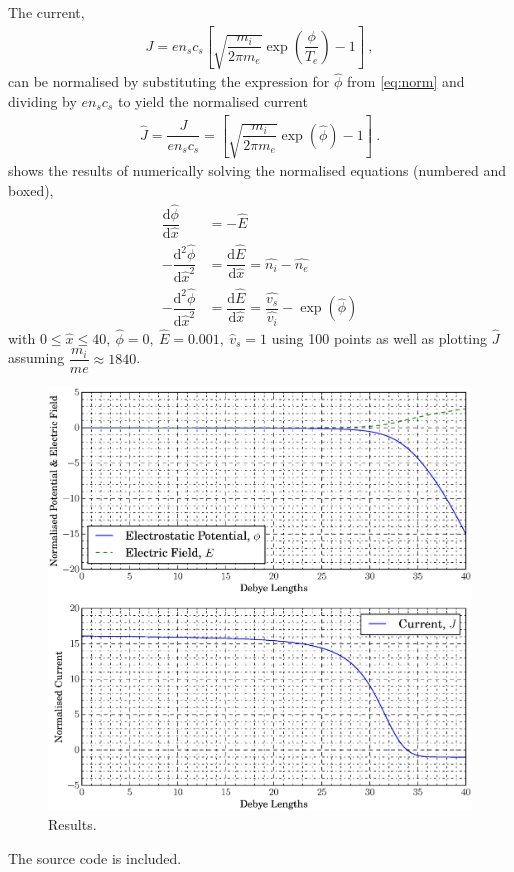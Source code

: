 \documentclass[10pt,a4paper]{article}
\begin{document}
	The current,
	\begin{align} \label{eq:current}
		J = e n_{s} c_{s} \left[ \sqrt{\dfrac{m_{i}}{2 \pi m_{e}}} \exp\left(\dfrac{\phi}{T_{e}}\right) - 1 \right]~,
	\end{align}
	can be normalised by substituting the expression for $\hat{\phi}$ from \cref{eq:norm} and dividing by $e n_{s} c_{s}$ to yield the normalised current
	\begin{align} \label{eq:ncurrent}
		\hat{J} = \dfrac{J}{e n_{s} c_{s}} = \left[ \sqrt{\dfrac{m_{i}}{2 \pi m_{e}}} \exp\left(\hat{\phi}\right) - 1 \right]~.
	\end{align}
	 shows the results of numerically solving the normalised equations (numbered and boxed),
	\begin{subequations}
		\begin{align} \label{eq:derivs}
			\dfrac{\mathrm{d}\hat{\phi}}{\mathrm{d}\hat{x}} &= -\hat{E} \\
			-\dfrac{\mathrm{d}^{2}\hat{\phi}}{\mathrm{d} \hat{x}^{2}} &= \dfrac{\mathrm{d} \hat{E}}{\mathrm{d} \hat{x}} = \widehat{n_{i}} - \widehat{n_{e}} \nonumber\\
			-\dfrac{\mathrm{d}^{2}\hat{\phi}}{\mathrm{d} \hat{x}^{2}} &= \dfrac{\mathrm{d} \hat{E}}{\mathrm{d} \hat{x}} = \dfrac{\widehat{v_{s}}}{\widehat{v_{i}}} - \exp\left(\hat{\phi}\right)
		\end{align}
	\end{subequations}
	with $0 \leq \hat{x} \leq 40,~\hat{\phi} = 0,~\hat{E} = 0.001,~\hat{v}_{s} = 1$ using 100 points as well as plotting $\hat{J}$ assuming $\dfrac{m_{i}}{m{e}} \approx 1840$.
	\begin{figure}
		\includegraphics[width=\textwidth]{debye.eps}
		\caption{Results.}\label{fig:results}
	\end{figure}
	The source code is included.
	\inputminted[linenos = true,
				 breaklines, 
				 breakanywhere]{python}{assignment1.py}
\end{document}
